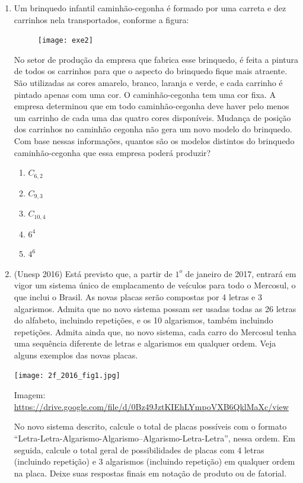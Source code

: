 \begin{enumerate}
\item Um brinquedo infantil caminhão-cegonha é formado por uma carreta e dez carrinhos nela transportados, conforme a figura:

\begin{figure}[H]
\centering

\texttt{[image: exe2]}
\end{figure}

No setor de produção da empresa que fabrica esse brinquedo, é feita a pintura de todos os carrinhos para que o aspecto do brinquedo fique mais atraente. São utilizadas as cores amarelo, branco, laranja e verde, e cada carrinho é pintado apenas com uma cor. O caminhão-cegonha tem uma cor fixa. A empresa determinou que em todo caminhão-cegonha deve haver pelo menos um carrinho de cada uma das quatro cores disponíveis. Mudança de posição dos carrinhos no caminhão cegonha não gera um novo modelo do brinquedo.
Com base nessas informações, quantos são os modelos distintos do brinquedo caminhão-cegonha que essa empresa poderá produzir?
 
 \begin{enumerate}
 
\item $C_{6,2}$
\item $C_{9,3}$
\item $C_{10,4}$
\item $6^4$
\item $4^6$
\end{enumerate}

\item (Unesp 2016) Está previsto que, a partir de $1^{o}$ de janeiro de 2017, entrará em vigor um sistema único de emplacamento de veículos para todo o Mercosul, o que inclui o Brasil. As novas placas serão compostas por 4 letras e 3 algarismos. Admita que no novo sistema possam ser usadas todas as 26 letras do alfabeto, incluindo repetições, e os 10 algarismos, também incluindo repetições. Admita ainda que, no novo sistema, cada carro do Mercosul tenha uma sequência diferente de letras e algarismos em qualquer ordem. Veja alguns exemplos das novas placas.

\begin{center}
\texttt{[image: 2f\_2016\_fig1.jpg]}
\end{center}

Imagem: \url{https://drive.google.com/file/d/0Bz49JztKIEhLYmpoVXB6QklMaXc/view}

No novo sistema descrito, calcule o total de placas possíveis com o formato “Letra-Letra-Algarismo-Algarismo–Algarismo-Letra-Letra”, nessa ordem. Em seguida, calcule o total geral de possibilidades de placas com 4 letras (incluindo repetição) e 3 algarismos (incluindo repetição) em qualquer ordem na placa. Deixe suas respostas finais em notação de produto ou de fatorial.


\end{enumerate}

